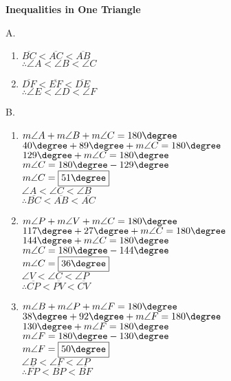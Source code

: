 \begin{center}
\textbf{Inequalities in One Triangle}\\
\end{center}

\vspace*{1ex}

\begin{multicols}{2}

A. 
\begin{enumerate}[label = \arabic*. ]
\item $\overline{BC} < \overline{AC} < \overline{AB} $ \redcheck \\
$\therefore \angle{A} < \angle{B} < \angle{C} $ \redcheck 
\item $\overline{DF} < \overline{EF} < \overline{DE} $ \redcheck \\
$\therefore \angle{E} < \angle{D} < \angle{F} $ \redcheck 
\end{enumerate}   

B. 
\begin{enumerate}[label = \arabic*. ]
\item $m\angle{A} + m\angle{B} + m\angle{C} = 180 \degree$ \redcheck \\
$40\degree + 89\degree + m\angle{C} = 180 \degree$ \redcheck \\
$129\degree + m\angle{C} = 180 \degree$ \redcheck \\
$ m\angle{C} = 180 \degree - 129\degree$ \redcheck \\
$ m\angle{C} = \fbox{51\degree}$ \redcheck \\
$\angle{A} < \angle{C} < \angle{B} $ \redcheck \\
$\therefore \overline{BC} < \overline{AB} < \overline{AC} $ \redcheck  
 
\item $m\angle{P} + m\angle{V} + m\angle{C} = 180 \degree$ \redcheck \\
$ 117\degree + 27\degree + m\angle{C} = 180 \degree$ \redcheck \\
$ 144\degree + m\angle{C} = 180 \degree$ \redcheck \\
$ m\angle{C} = 180 \degree - 144\degree$ \redcheck \\
$ m\angle{C} = \fbox{36\degree} $ \redcheck \\
$\angle{V} < \angle{C} < \angle{P} $ \redcheck \\
$\therefore \overline{CP} < \overline{PV} < \overline{CV} $ \redcheck 
\item $m\angle{B} + m\angle{P} + m\angle{F} = 180 \degree$ \redcheck \\
$ 38\degree + 92\degree + m\angle{F} = 180 \degree$ \redcheck \\
$ 130\degree + m\angle{F} = 180 \degree$ \redcheck \\
$ m\angle{F} = 180 \degree - 130\degree$ \redcheck \\
$ m\angle{F} = \fbox{50\degree}$ \redcheck \\
$\angle{B} < \angle{F} < \angle{P} $ \redcheck \\
$\therefore \overline{FP} < \overline{BP} < \overline{BF} $ \redcheck 
\end{enumerate} 


\end{multicols}
